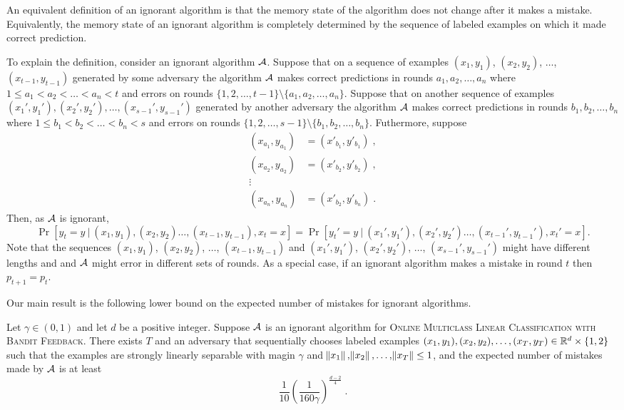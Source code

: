An equivalent definition of an ignorant algorithm is that the memory state of
the algorithm does not change after it makes a mistake. Equivalently,
the memory state of an ignorant algorithm is completely determined
by the sequence of labeled examples on which it made correct prediction.

To explain the definition, consider an ignorant algorithm $\mathcal{A}$. Suppose that
on a sequence of examples $(x_1, y_1)$, $(x_2, y_2)$, $\dots$, $(x_{t-1}, y_{t-1})$
generated by some adversary the algorithm $\mathcal{A}$ makes correct predictions in
rounds $a_1, a_2, \dots, a_n$ where $1 \le a_1 < a_2 < \dots < a_n < t$ and
errors on rounds $\{1,2,\dots,t-1\} \setminus \{a_1, a_2, \dots, a_n\}$. Suppose
that on another sequence of examples $(x_1', y_1'), (x_2', y_2'), \dots,
(x_{s-1}', y_{s-1}')$ generated by another adversary the algorithm $\mathcal{A}$ makes
correct predictions in rounds $b_1, b_2, \dots, b_n$ where $1 \le b_1 < b_2 <
\dots < b_n < s$ and errors on rounds $\{1,2,\dots,s-1\} \setminus \{b_1, b_2,
\dots, b_n\}$. Futhermore, suppose
\begin{align*}
(x_{a_1}, y_{a_1}) &= (x'_{b_1}, y'_{b_1}) \; , \\
(x_{a_2}, y_{a_2}) &= (x'_{b_2}, y'_{b_2}) \; , \\
\vdots \\
(x_{a_n}, y_{a_n}) &= (x'_{b_2}, y'_{b_n}) \; .
\end{align*}
Then, as $\mathcal{A}$ is ignorant,
$$
\Pr[y_t = y ~|~ (x_1, y_1), (x_2, y_2) \dots, (x_{t-1}, y_{t-1}), x_t = x] =
\Pr[y_t' = y ~|~ (x_1', y_1'), (x_2', y_2') \dots, (x_{t-1}', y_{t-1}'), x_t' = x].
$$
Note that the sequences $(x_1, y_1)$, $(x_2, y_2)$, $\dots$, $(x_{t-1},
y_{t-1})$ and $(x_1', y_1')$, $(x_2', y_2')$, $\dots$, $(x_{s-1}', y_{s-1}')$
might have different lengths and and $\mathcal{A}$ might error in different sets of
rounds. As a special case, if an ignorant algorithm makes a mistake in round $t$
then $p_{t+1}=p_t$.

Our main result is the following lower bound on the expected number of mistakes
for ignorant algorithms.

\begin{theorem}
\label{theorem:ignorant-lower-bound}
Let $\gamma \in (0,1)$ and let $d$ be a positive integer. Suppose $\mathcal{A}$ is an
ignorant algorithm for \textsc{Online Multiclass Linear Classification with
Bandit Feedback}. There exists $T$ and an adversary that sequentially chooses
labeled examples $(x_1, y_1), (x_2, y_2), \dots, (x_T, y_T) \in \mathbb{R}^d\times
\{1,2\}$ such that the examples are strongly linearly separable with magin
$\gamma$ and $\norm{x_1}, \norm{x_2}, \dots, \norm{x_T} \le 1$, and the expected
number of mistakes made by $\mathcal{A}$ is at least
$$
\frac{1}{10} \left(\frac{1}{160\gamma}\right)^{\frac{d-2}{4}} \; .
$$
\end{theorem}

